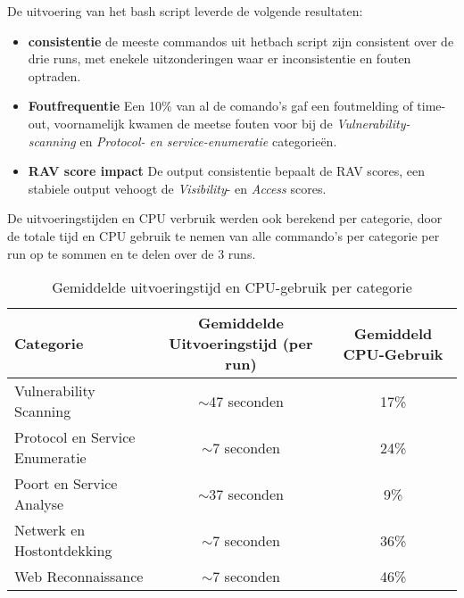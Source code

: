 De uitvoering van het bash script leverde de volgende resultaten:

\begin{itemize}
  \item \textbf{consistentie} de meeste commandos uit hetbach script zijn consistent over de drie runs, met enekele uitzonderingen waar er inconsistentie en fouten optraden.
  \item \textbf{Foutfrequentie} Een 10\% van al de comando's gaf een foutmelding of time-out, voornamelijk kwamen de meetse fouten voor bij de \textit{Vulnerability-scanning} en \textit{Protocol- en service-enumeratie} categorieën.
  \item \textbf{RAV score impact} De output consistentie bepaalt de RAV scores, een stabiele output vehoogt de \textit{Visibility}- en \textit{Access} scores.
  
\end{itemize}


De uitvoeringstijden en CPU verbruik werden ook berekend per categorie, door de totale tijd en CPU gebruik te nemen van alle commando's per categorie per run op te sommen en te delen over de 3 runs.

% 


\begin{table}[h]
  \centering
  \footnotesize
  \begin{tabular}{lcc}
  \toprule
  \textbf{Categorie} & \textbf{Gemiddelde Uitvoeringstijd (per run)} & \textbf{Gemiddeld CPU-Gebruik} \\
  \midrule
  Vulnerability Scanning & $\sim$47 seconden & 17\% \\
  Protocol en Service Enumeratie & $\sim$7 seconden & 24\% \\
  Poort en Service Analyse & $\sim$37 seconden & 9\% \\
  Netwerk en Hostontdekking & $\sim$7 seconden & 36\% \\
  Web Reconnaissance & $\sim$7 seconden & 46\% \\
  \bottomrule
  \end{tabular}
  \caption{Gemiddelde uitvoeringstijd en CPU-gebruik per categorie}{\label{tab:cpu-uitvoeringstijd}}
\end{table}

